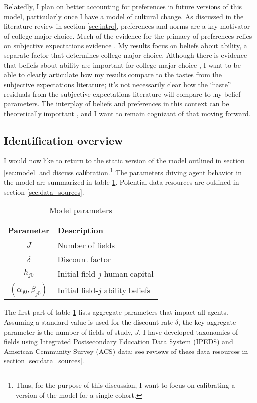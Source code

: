 \documentclass[11 pt]{article}
\begin{document}
Relatedly, I plan on better accounting for preferences in future versions of this model, particularly once I have a model of cultural change. 
As discussed in the literature review in section \ref{sec:intro}, preferences and norms are a key motivator of college major choice.
Much of the evidence for the primacy of preferences relies on subjective expectations evidence \parencite{WZ18,AHMR20}.
My results focus on beliefs about ability, a separate factor that determines college major choice.
Although there is evidence that beliefs about ability are important for college major choice \parencite{O20}, I want to be able to clearly articulate how my results compare to the tastes from the subjective expectations literature; it's not necessarily clear how the ``taste'' residuals from the subjective expectations literature will compare to my belief parameters.
The interplay of beliefs and preferences in this context can be theoretically important \parencite{BG02}, and I want to remain cognizant of that moving forward.

\subsection{Identification overview}\label{sec:identification_overview}

I would now like to return to the static version of the model outlined in section \ref{sec:model} and discuss calibration.\footnote{
    Thus, for the purpose of this discussion, I want to focus on calibrating a version of the model for a single cohort.
}
The parameters driving agent behavior in the model are summarized in table \ref{tab:parameter_descriptions}.
Potential data resources are outlined in section \ref{sec:data_sources}.
\begin{table}[!ht]
\centering
\caption{Model parameters}{}
\label{tab:parameter_descriptions}
\begin{tabular}{cl}
\hline \hline{}
Parameter & Description %
\\ \hline{}
$J$ & Number of fields %
\\
$\delta$ & Discount factor
\\ \hline
$h_{j0}$ & Initial field-$j$ human capital
\\ 
$(\alpha_{j0}, \beta_{j0})$ & Initial field-$j$ ability beliefs
\\ \hline \hline
\end{tabular}
\end{table}
The first part of table \ref{tab:parameter_descriptions} lists aggregate parameters that impact all agents.
Assuming a standard value is used for the discount rate $\delta$, the key aggregate parameter is the number of fields of study, $J$. 
I have developed taxonomies of fields using Integrated Postsecondary Education Data System (IPEDS) and American Community Survey (ACS) data; see reviews of these data resources in section \ref{sec:data_sources}.
\end{document}
